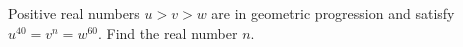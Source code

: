 Positive real numbers $u>v>w$ are in geometric progression and satisfy $u^{40}=v^n=w^{60}$. Find the real number $n$.

